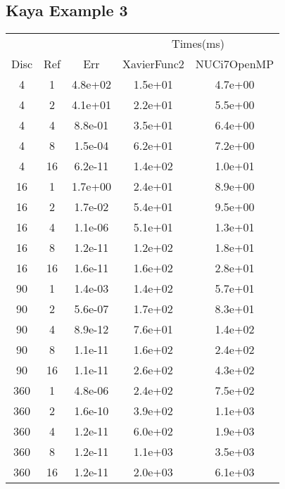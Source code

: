 \subsection{Kaya Example 3}
\begin{center}
\begin{tabular}{c|c|c|c|c}
	&&&\multicolumn{2}{|c}{Times(ms)}\\
	Disc&Ref&Err&XavierFunc2&NUCi7OpenMP\\
\hline
4&1&4.8e+02&1.5e+01&4.7e+00\\
4&2&4.1e+01&2.2e+01&5.5e+00\\
4&4&8.8e-01&3.5e+01&6.4e+00\\
4&8&1.5e-04&6.2e+01&7.2e+00\\
4&16&6.2e-11&1.4e+02&1.0e+01\\
\hline
16&1&1.7e+00&2.4e+01&8.9e+00\\
16&2&1.7e-02&5.4e+01&9.5e+00\\
16&4&1.1e-06&5.1e+01&1.3e+01\\
16&8&1.2e-11&1.2e+02&1.8e+01\\
16&16&1.6e-11&1.6e+02&2.8e+01\\
\hline
90&1&1.4e-03&1.4e+02&5.7e+01\\
90&2&5.6e-07&1.7e+02&8.3e+01\\
90&4&8.9e-12&7.6e+01&1.4e+02\\
90&8&1.1e-11&1.6e+02&2.4e+02\\
90&16&1.1e-11&2.6e+02&4.3e+02\\
\hline
360&1&4.8e-06&2.4e+02&7.5e+02\\
360&2&1.6e-10&3.9e+02&1.1e+03\\
360&4&1.2e-11&6.0e+02&1.9e+03\\
360&8&1.2e-11&1.1e+03&3.5e+03\\
360&16&1.2e-11&2.0e+03&6.1e+03\\
\hline
\end{tabular}
\end{center}







